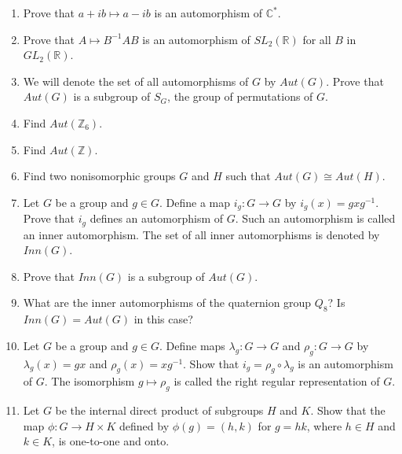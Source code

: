 {\begin{enumerate}
\item
Prove that $a + ib \mapsto a - ib$ is an automorphism of ${\mathbb C}^*$. 
 

\item
Prove that $A \mapsto B^{-1}AB$ is an automorphism of $SL_2({\mathbb R})$
for all $B$ in $GL_2({\mathbb R})$. 
 

\item
We will denote the set of all automorphisms of $G$ by
$Aut(G)$\label{noteauto}.  Prove that  $Aut(G)$ is a subgroup of
$S_G$, the group of permutations of $G$. 
 

\item
Find $Aut( {\mathbb Z}_6)$.
 

\item
Find $Aut( {\mathbb Z})$.
 

\item
Find two nonisomorphic groups $G$ and $H$ such that $Aut(G) \cong Aut(
H)$. 
 

\item
Let $G$ be a group and $g \in G$. Define a map $i_g : G \rightarrow
G$\label{noteinner} 
by $i_g(x) = g x g^{-1}$.  Prove that $i_g$ defines an automorphism of
$G$.  Such an automorphism is called an {\bfi inner
automorphism}. The set of all inner
automorphisms is denoted by $Inn(G)$\label{noteinneraut}. 
 

\item
Prove that $Inn(G)$ is a subgroup of $Aut(G)$.
 

\item
What are the inner automorphisms of the quaternion group $Q_8$? Is
$Inn(G) = Aut(G)$ in this case? 
 

\item
Let $G$ be a group and $g \in G$.  Define maps $\lambda_g :G
\rightarrow G$ and $\rho_g :G \rightarrow G$\label{noterightreg}
 by $\lambda_g(x) = gx$
and $\rho_g(x) = xg^{-1}$. Show that $i_g = \rho_g \circ \lambda_g$ is
an automorphism of $G$. The isomorphism $g \mapsto \rho_g$ is called
the {\bfi right regular representation\/} of $G$. 
 

\item
Let $G$ be the internal direct product of subgroups $H$ and $K$.  Show
that the map $\phi : G \rightarrow H \times K$ defined by  $\phi(g) =
(h,k)$ for $g =hk$,  where $h \in H$ and  $k \in K$, is one-to-one and
onto. 
 


\end{enumerate}}
